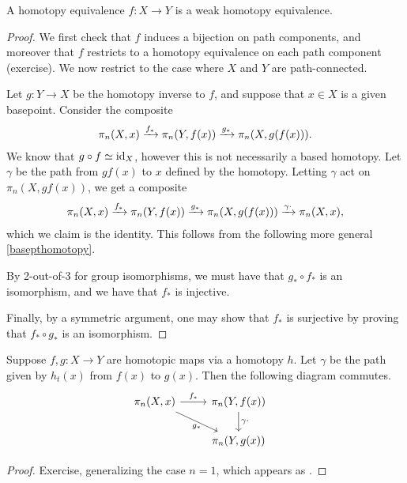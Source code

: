 \documentclass{article}[11pt]
\begin{document}
\begin{proposition}\label{htpyequivisweak} A homotopy equivalence $f: X\to Y$ is a weak homotopy equivalence.
\end{proposition}
\begin{proof} We first check that $f$ induces a bijection on path components, and moreover that $f$ restricts to a homotopy equivalence on each path component (exercise). We now restrict to the case where $X$ and $Y$ are path-connected.

Let $g: Y \to X$ be the homotopy inverse to $f$, and suppose that $x\in X$ is a given basepoint. Consider the composite
\begin{align*}
	\pi_n(X,x) \xrightarrow{f_\ast} \pi_n(Y,f(x)) \xrightarrow{g_\ast} \pi_n(X, g(f(x))).
\end{align*}
We know that $g\circ f \simeq \text{id}_X$, however this is not necessarily a based homotopy. Let $\gamma$ be the path from $gf(x)$ to $x$ defined by the homotopy. Letting $\gamma$ act on $\pi_n(X,gf(x))$, we get a composite
\begin{align*}
	\pi_n(X,x) \xrightarrow{f_\ast} \pi_n(Y,f(x)) \xrightarrow{g_\ast} \pi_n(X, g(f(x))) \xrightarrow{\gamma\cdot} \pi_n(X,x),
\end{align*}
which we claim is the identity. This follows from the following more general \autoref{basepthomotopy}.

By 2-out-of-3 for group isomorphisms, we must have that $g_\ast \circ f_\ast$ is an isomorphism, and we have that $f_\ast$ is injective.

Finally, by a symmetric argument, one may show that $f_\ast$ is surjective by proving that $f_\ast \circ g_\ast$ is an isomorphism.
\end{proof}

\begin{lemma}\label{basepthomotopy}
Suppose $f,g\colon X\to Y$ are homotopic maps via a homotopy $h$. Let $\gamma$ be the path given by $h_t(x)$ from $f(x)$ to $g(x)$. Then the following diagram commutes.
\[
	\begin{tikzcd}
	\pi_n(X,x)\rar["f_\ast" above]\ar[dr, "g_\ast" below] & \pi_n(Y, f(x))\dar["\gamma\cdot" right] \\
	 & \pi_n(Y, g(x))
	\end{tikzcd}\quad
\]

\end{lemma}

\begin{proof}
Exercise, generalizing the case $n=1$, which appears as \cite[Proposition 1.18]{hatcher}.
\end{proof}
\end{document}
